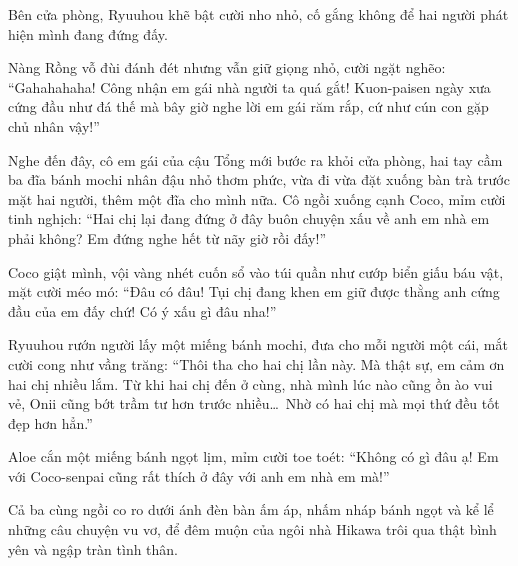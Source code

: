 \documentclass[../main.tex]{subfiles}
\begin{document}
Bên cửa phòng, Ryuuhou khẽ bật cười nho nhỏ, cố gắng không để hai người phát hiện mình đang đứng đấy.

Nàng Rồng vỗ đùi đánh đét nhưng vẫn giữ giọng nhỏ, cười ngặt nghẽo: ``Gahahahaha! Công nhận em gái nhà người ta quá gắt! Kuon-paisen ngày xưa cứng đầu như đá thế mà bây giờ nghe lời em gái răm rắp, cứ như cún con gặp chủ nhân vậy!''

Nghe đến đây, cô em gái của cậu Tổng mới bước ra khỏi cửa phòng, hai tay cầm ba đĩa bánh mochi nhân đậu nhỏ thơm phức, vừa đi vừa đặt xuống bàn trà trước mặt hai người, thêm một đĩa cho mình nữa. Cô ngồi xuống cạnh Coco, mỉm cười tinh nghịch: ``Hai chị lại đang đứng ở đây buôn chuyện xấu về anh em nhà em phải không? Em đứng nghe hết từ nãy giờ rồi đấy!''

Coco giật mình, vội vàng nhét cuốn sổ vào túi quần như cướp biển giấu báu vật, mặt cười méo mó: ``Đâu có đâu! Tụi chị đang khen em giữ được thằng anh cứng đầu của em đấy chứ! Có ý xấu gì đâu nha!''

Ryuuhou rướn người lấy một miếng bánh mochi, đưa cho mỗi người một cái, mắt cười cong như vầng trăng: ``Thôi tha cho hai chị lần này. Mà thật sự, em cảm ơn hai chị nhiều lắm. Từ khi hai chị đến ở cùng, nhà mình lúc nào cũng ồn ào vui vẻ, Onii cũng bớt trầm tư hơn trước nhiều\dots\ Nhờ có hai chị mà mọi thứ đều tốt đẹp hơn hẳn.''

Aloe cắn một miếng bánh ngọt lịm, mỉm cười toe toét: ``Không có gì đâu ạ! Em với Coco-senpai cũng rất thích ở đây với anh em nhà em mà!''

Cả ba cùng ngồi co ro dưới ánh đèn bàn ấm áp, nhấm nháp bánh ngọt và kể lể những câu chuyện vu vơ, để đêm muộn của ngôi nhà Hikawa trôi qua thật bình yên và ngập tràn tình thân.
\end{document}

